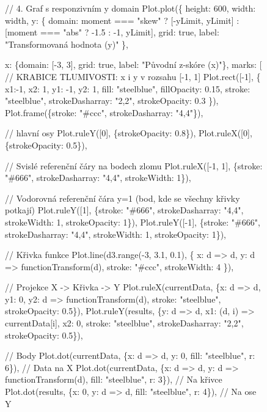 \documentclass[
  czech,
  11pt,
  letterpaper,
  DIV=11,
  numbers=noendperiod]{scrreprt}
\newenvironment{Shaded}{\begin{snugshade}}{\end{snugshade}}
\newcommand{\NormalTok}[1]{\textcolor[rgb]{0.00,0.23,0.31}{#1}}
\begin{document}
\begin{figure}
{\begin{Shaded}
\begin{Highlighting}[]
\NormalTok{// 4. Graf s responzivním y domain}
\NormalTok{Plot.plot(\{}
\NormalTok{  height: 600,}
\NormalTok{  width: width,}
\NormalTok{  y: \{}
\NormalTok{    domain: moment === "skew" ? [{-}yLimit, yLimit] : [moment === "abs" ? {-}1.5 : {-}1, yLimit], }
\NormalTok{    grid: true, }
\NormalTok{    label: "Transformovaná hodnota (y)"}
\NormalTok{  \},}

\NormalTok{  x: \{domain: [{-}3, 3], grid: true, label: "Původní z{-}skóre (x)"\},}
\NormalTok{  marks: [}
\NormalTok{    // KRABICE TLUMIVOSTI: x i y v rozsahu [{-}1, 1]}
\NormalTok{    Plot.rect([{-}1], \{}
\NormalTok{      x1:{-}1, x2: 1, y1: {-}1, y2: 1, }
\NormalTok{      fill: "steelblue", fillOpacity: 0.15,}
\NormalTok{      stroke: "steelblue",}
\NormalTok{      strokeDasharray: "2,2",}
\NormalTok{      strokeOpacity: 0.3}
\NormalTok{    \}),}
\NormalTok{    Plot.frame(\{stroke: "\#ccc", strokeDasharray: "4,4"\}),}
    
\NormalTok{    // hlavní osy }
\NormalTok{    Plot.ruleY([0], \{strokeOpacity: 0.8\}),}
\NormalTok{    Plot.ruleX([0], \{strokeOpacity: 0.5\}),}

\NormalTok{    // Svislé referenční čáry na bodech zlomu}
\NormalTok{    Plot.ruleX([{-}1, 1], \{stroke: "\#666", strokeDasharray: "4,4", strokeWidth: 1\}),}
    
\NormalTok{    // Vodorovná referenční čára y=1 (bod, kde se všechny křivky potkají)}
\NormalTok{    Plot.ruleY([1], \{stroke: "\#666", strokeDasharray: "4,4", strokeWidth: 1, strokeOpacity: 1\}),}
\NormalTok{    Plot.ruleY([{-}1], \{stroke: "\#666", strokeDasharray: "4,4", strokeWidth: 1, strokeOpacity: 1\}),}

\NormalTok{    // Křivka funkce}
\NormalTok{    Plot.line(d3.range({-}3, 3.1, 0.1), \{}
\NormalTok{      x: d =\textgreater{} d, }
\NormalTok{      y: d =\textgreater{} functionTransform(d), }
\NormalTok{      stroke: "\#ccc", strokeWidth: 4}
\NormalTok{    \}),}

\NormalTok{    // Projekce X {-}\textgreater{} Křivka {-}\textgreater{} Y}
\NormalTok{    Plot.ruleX(currentData, \{x: d =\textgreater{} d, y1: 0, y2: d =\textgreater{} functionTransform(d), stroke: "steelblue", strokeOpacity: 0.5\}),}
\NormalTok{    Plot.ruleY(results, \{y: d =\textgreater{} d, x1: (d, i) =\textgreater{} currentData[i], x2: 0, stroke: "steelblue", strokeDasharray: "2,2", strokeOpacity: 0.5\}),}

\NormalTok{    // Body}
\NormalTok{    Plot.dot(currentData, \{x: d =\textgreater{} d, y: 0, fill: "steelblue", r: 6\}), // Data na X}
\NormalTok{    Plot.dot(currentData, \{x: d =\textgreater{} d, y: d =\textgreater{} functionTransform(d), fill: "steelblue", r: 3\}), // Na křivce}
\NormalTok{    Plot.dot(results, \{x: 0, y: d =\textgreater{} d, fill: "steelblue", r: 4\}), // Na ose Y}


\end{Highlighting}
\end{Shaded}}
\end{figure}
\end{document}
